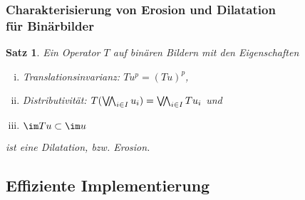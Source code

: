 \documentclass{beamer}
\newtheorem{satz}[theorem]{Satz}
\begin{document}
\begin{frame}
    \frametitle{Charakterisierung von Erosion und Dilatation\\ für Binärbilder}
    \begin{satz}
        Ein Operator $T$ auf binären Bildern mit den Eigenschaften
        \begin{enumerate}[i)]
            \item \pause
                Translationsinvarianz: $Tu^p = (Tu)^p$,
            \item \pause
                Distributivität: $T (\bigveewedge_{i\in I} u_i) = \bigveewedge_{i \in I} T u_i$ und
            \item \pause
                $\im Tu \subset \im u$
        \end{enumerate}
        ist eine Dilatation, bzw. Erosion.
    \end{satz}
\end{frame}

\subsection{Effiziente Implementierung}
\end{document}
